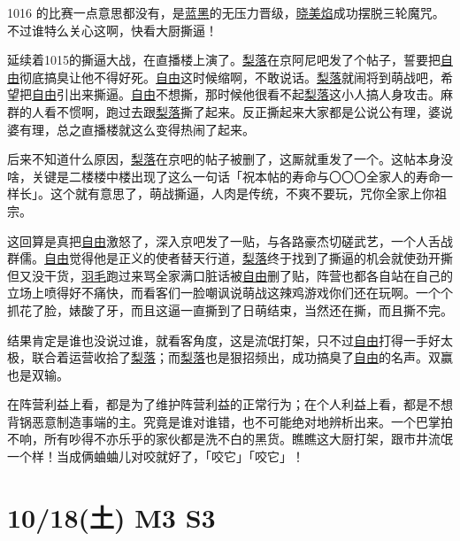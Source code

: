 1016 的比赛一点意思都没有，是\uline{蓝}\uline{黑}的无压力晋级，\uline{晓美焰}成功摆脱三轮魔咒。不过谁特么关心这啊，快看大厨撕逼！

延续着1015的撕逼大战，在直播楼上演了。\uline{梨落}在京阿尼吧发了个帖子，誓要把\uline{自由}彻底搞臭让他不得好死。\uline{自由}这时候缩啊，不敢说话。\uline{梨落}就闹将到萌战吧，希望把\uline{自由}引出来撕逼。\uline{自由}不想撕，那时候他很看不起\uline{梨落}这小人搞人身攻击。麻群的人看不惯啊，跑过去跟\uline{梨落}撕了起来。反正撕起来大家都是公说公有理，婆说婆有理，总之直播楼就这么变得热闹了起来。

后来不知道什么原因，\uline{梨落}在京吧的帖子被删了，这厮就重发了一个。这帖本身没啥，关键是二楼楼中楼出现了这么一句话「祝本帖的寿命与〇〇〇全家人的寿命一样长」。这个就有意思了，萌战撕逼，人肉是传统，不爽不要玩，咒你全家上你祖宗。

这回算是真把\uline{自由}激怒了，深入京吧发了一贴，与各路豪杰切磋武艺，一个人舌战群儒。\uline{自由}觉得他是正义的使者替天行道，\uline{梨落}终于找到了撕逼的机会就使劲开撕但又没干货，\uline{羽毛}跑过来骂全家满口脏话被\uline{自由}删了贴，阵营也都各自站在自己的立场上喷得好不痛快，而看客们一脸嘲讽说萌战这辣鸡游戏你们还在玩啊。一个个抓花了脸，婊酸了牙，而且这逼一直撕到了日萌结束，当然还在撕，而且撕不完。

结果肯定是谁也没说过谁，就看客角度，这是流氓打架，只不过\uline{自由}打得一手好太极，联合着运营收拾了\uline{梨落}；而\uline{梨落}也是狠招频出，成功搞臭了\uline{自由}的名声。双赢也是双输。

在阵营利益上看，都是为了维护阵营利益的正常行为；在个人利益上看，都是不想背锅恶意制造事端的主。究竟是谁对谁错，也不可能绝对地辨析出来。一个巴掌拍不响，所有吵得不亦乐乎的家伙都是洗不白的黑货。瞧瞧这大厨打架，跟市井流氓一个样！当成俩蛐蛐儿对咬就好了，「咬它」「咬它」！

\section{10/18(土) M3 S3}


